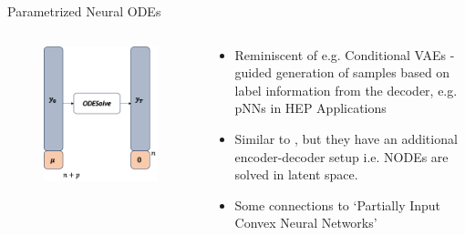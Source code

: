 \documentclass[usenames,dvipsnames]{beamer}
\theoremstyle{definition}
\let\oldcite=\cite
\renewcommand{\cite}[2][]{\textcolor{green}{\oldcite[#1]{#2}}}
\begin{document}
\begin{frame}{Parametrized Neural ODEs}
    \begin{columns}
        \begin{column}{0.51\textwidth}
            \begin{figure}
                \centering
                \includegraphics[width=0.7\linewidth]{pnode_idea.png}
                \label{fig:pnode_idea}
            \end{figure}
        \end{column}
        \begin{column}{0.52\textwidth}
            \begin{itemize}
                \item  Reminiscent of e.g. Conditional VAEs - guided generation of samples based on label information from the decoder, e.g. pNNs in HEP Applications \cite{anzalone_improving_2022}
                
                \item Similar to \cite{lee_parameterized_2021}, but they have an additional encoder-decoder setup i.e. NODEs are solved in latent space.
    
                \item Some connections to `Partially Input Convex Neural Networks' \cite{amos_input_2017}
    
            \end{itemize}
        \end{column}
    \end{columns}
\end{frame}
\end{document}
